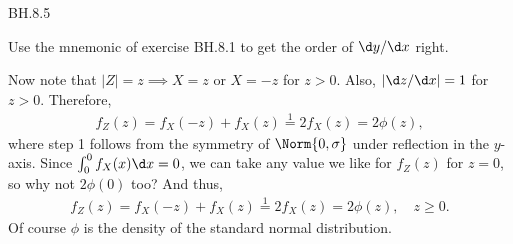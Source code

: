 
\setcounter{theorem}{4}
\begin{exercise} BH.8.5
\begin{solution}
Use the mnemonic of exercise BH.8.1 to get the order of $\d y/\d x$ right.

Now note that $|Z|=z \implies X = z$ or $X=-z$ for $z>0$.  Also, $|\d z/\d x| = 1$  for $z>0$. Therefore,
\begin{align*}
  f_{Z}(z) = f_{X}(-z)  + f_X(z) \stackrel1 = 2f_X(z) = 2\phi(z),
\end{align*}
where step 1 follows from the symmetry of $\Norm{0, \sigma}$ under reflection in the $y$-axis. Since $\int_0^0 f_X(x) \d x = 0$, we can take any value we like for $f_{Z}(z)$ for $z=0$, so why not $2 \phi(0)$ too? And thus,
\begin{align*}
  f_{Z}(z) = f_{X}(-z)  + f_X(z) \stackrel1 = 2f_X(z) = 2\phi(z), \quad z \geq 0.
\end{align*}
Of course $\phi$ is the density of the standard normal distribution.
\end{solution}
\end{exercise}

